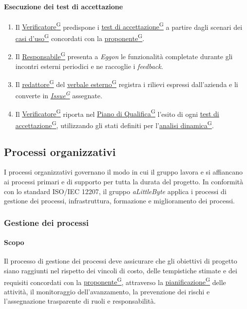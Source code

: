 \documentclass[a4paper,12pt]{article}
\providecommand{\glslink}[2]{\href{https://alittlebyte-19.github.io/Documentazione/glossario.html\#gls-#1}{\underline{#2}\textsuperscript{\scriptsize G}}}
\begin{document}
\paragraph{Esecuzione dei test di accettazione}
\begin{enumerate}
    \item Il \glslink{verificatore}{Verificatore} predispone i \glslink{test-di-accettazione}{test di accettazione} a partire dagli scenari dei \glslink{caso-d-uso-uc}{casi d'uso} concordati con la \glslink{committente-proponente}{proponente}.
    \item Il \glslink{responsabile}{Responsabile} presenta a \textit{Eggon} le funzionalità completate durante gli incontri esterni periodici e ne raccoglie i \textit{feedback}.
    \item Il \glslink{redattore}{redattore} del \glslink{verbale-esterno}{verbale esterno} registra i rilievi espressi dall'azienda e li converte in \textit{\glslink{issue}{Issue}} assegnate.
    \item Il \glslink{verificatore}{Verificatore} riporta nel \glslink{piano-di-qualifica}{Piano di Qualifica} l'esito di ogni \glslink{test-di-accettazione}{test di accettazione}, utilizzando gli stati definiti per l'\glslink{analisi-dinamica}{analisi dinamica}.
\end{enumerate}

\subsection{Processi organizzativi}
I processi organizzativi governano il modo in cui il gruppo lavora e si affiancano ai processi primari e di supporto per tutta la durata del progetto. In conformità con lo standard ISO/IEC 12207, il gruppo \textit{aLittleByte} applica i processi di gestione dei processi, infrastruttura, formazione e miglioramento dei processi.

\subsubsection{Gestione dei processi}

\paragraph{Scopo}
Il processo di gestione dei processi deve assicurare che gli obiettivi di progetto siano raggiunti nel rispetto dei vincoli di costo, delle tempistiche stimate e dei requisiti concordati con la \glslink{committente-proponente}{proponente}, attraverso la \glslink{pianificazione}{pianificazione} delle attività, il monitoraggio dell'avanzamento, la prevenzione dei rischi e l'assegnazione trasparente di ruoli e responsabilità.
\end{document}
